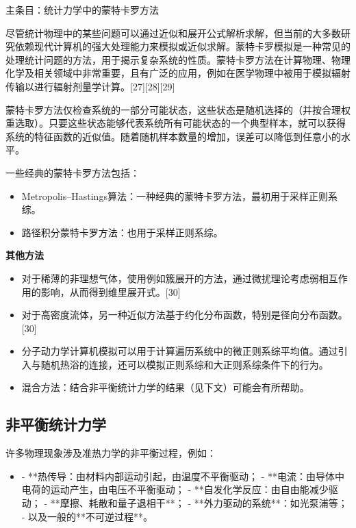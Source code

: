 主条目：统计力学中的蒙特卡罗方法

尽管统计物理中的某些问题可以通过近似和展开公式解析求解，但当前的大多数研究依赖现代计算机的强大处理能力来模拟或近似求解。蒙特卡罗模拟是一种常见的处理统计问题的方法，用于揭示复杂系统的性质。蒙特卡罗方法在计算物理、物理化学及相关领域中非常重要，且有广泛的应用，例如在医学物理中被用于模拟辐射传输以进行辐射剂量学计算。[27][28][29]

蒙特卡罗方法仅检查系统的一部分可能状态，这些状态是随机选择的（并按合理权重选取）。只要这些状态能够代表系统所有可能状态的一个典型样本，就可以获得系统的特征函数的近似值。随着随机样本数量的增加，误差可以降低到任意小的水平。

一些经典的蒙特卡罗方法包括：
\begin{itemize}
\item Metropolis–Hastings算法：一种经典的蒙特卡罗方法，最初用于采样正则系综。
\item 路径积分蒙特卡罗方法：也用于采样正则系综。
\end{itemize}
\textbf{其他方法}
\begin{itemize}
\item 对于稀薄的非理想气体，使用例如簇展开的方法，通过微扰理论考虑弱相互作用的影响，从而得到维里展开式。[30]  
\item 对于高密度流体，另一种近似方法基于约化分布函数，特别是径向分布函数。[30]  
\item 分子动力学计算机模拟可以用于计算遍历系统中的微正则系综平均值。通过引入与随机热浴的连接，还可以模拟正则系综和大正则系综条件下的行为。  
\item 混合方法：结合非平衡统计力学的结果（见下文）可能会有所帮助。
\end{itemize}
\subsection{非平衡统计力学}
许多物理现象涉及准热力学的非平衡过程，例如：  
\begin{itemize}
\item - **热传导：由材料内部运动引起，由温度不平衡驱动；  
- **电流：由导体中电荷的运动产生，由电压不平衡驱动；  
- **自发化学反应：由自由能减少驱动；  
- **摩擦、耗散和量子退相干**；  
- **外力驱动的系统**：如光泵浦等；  
- 以及一般的**不可逆过程**。  
\end{itemize}